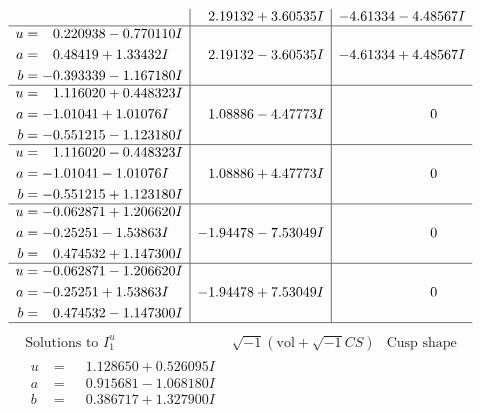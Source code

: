 \documentclass[1p]{elsarticle_modified}
\theoremstyle{definition}
\newcommand{\I}{\sqrt{-1}}
\begin{document}
$$\begin{array}{c|c|c}
 & \phantom{-}2.19132 + 3.60535 I & -4.61334 - 4.48567 I \\ \hline\begin{aligned}
u &= \phantom{-}0.220938 - 0.770110 I \\
a &= \phantom{-}0.48419 + 1.33432 I \\
b &= -0.393339 - 1.167180 I\end{aligned}
 & \phantom{-}2.19132 - 3.60535 I & -4.61334 + 4.48567 I \\ \hline\begin{aligned}
u &= \phantom{-}1.116020 + 0.448323 I \\
a &= -1.01041 + 1.01076 I \\
b &= -0.551215 - 1.123180 I\end{aligned}
 & \phantom{-}1.08886 - 4.47773 I & \phantom{-0.000000 } 0 \\ \hline\begin{aligned}
u &= \phantom{-}1.116020 - 0.448323 I \\
a &= -1.01041 - 1.01076 I \\
b &= -0.551215 + 1.123180 I\end{aligned}
 & \phantom{-}1.08886 + 4.47773 I & \phantom{-0.000000 } 0 \\ \hline\begin{aligned}
u &= -0.062871 + 1.206620 I \\
a &= -0.25251 - 1.53863 I \\
b &= \phantom{-}0.474532 + 1.147300 I\end{aligned}
 & -1.94478 - 7.53049 I & \phantom{-0.000000 } 0 \\ \hline\begin{aligned}
u &= -0.062871 - 1.206620 I \\
a &= -0.25251 + 1.53863 I \\
b &= \phantom{-}0.474532 - 1.147300 I\end{aligned}
 & -1.94478 + 7.53049 I & \phantom{-0.000000 } 0\\
 \hline 
 \end{array}$$\newpage$$\begin{array}{c|c|c}  
\text{Solutions to }I^u_{1}& \I (\text{vol} + \sqrt{-1}CS) & \text{Cusp shape}\\
 \hline 
\begin{aligned}
u &= \phantom{-}1.128650 + 0.526095 I \\
a &= \phantom{-}0.915681 - 1.068180 I \\
b &= \phantom{-}0.386717 + 1.327900 I\end{aligned}

\end{array}$$
\end{document}
